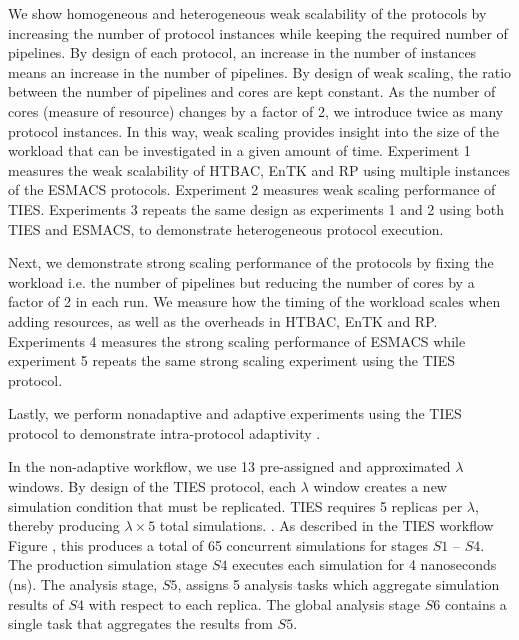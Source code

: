     We show homogeneous and heterogeneous weak scalability of the protocols by
increasing the number of protocol instances while keeping the required number
of pipelines. By design of each protocol, an increase in the number of
instances means an increase in the number of pipelines.  By design of weak 
scaling, the ratio between the number of pipelines and cores are kept constant. 
As the number of cores (measure of resource) changes by a factor of 2, we 
introduce twice as many protocol instances. In this way, weak scaling provides 
insight into the size of the workload that can be investigated in a given amount 
of time.
    Experiment 1 measures the weak scalability of HTBAC, EnTK and RP using 
multiple instances of the ESMACS protocols. Experiment 2 measures weak scaling 
performance of TIES. Experiments 3 repeats the same design as experiments 1 and 
2 using both TIES and ESMACS, to demonstrate heterogeneous protocol execution. 

    Next, we demonstrate strong scaling performance of the protocols by fixing 
the workload i.e. the number of pipelines but reducing the number of cores 
by a factor of 2 in each run. We measure how the timing of the workload 
scales when adding resources,  as well as the overheads in HTBAC, EnTK and RP. Experiments 4 
measures the strong scaling performance of ESMACS while experiment 5 repeats the 
same strong scaling experiment using the TIES protocol. 

    Lastly, we perform nonadaptive and adaptive experiments using the TIES 
protocol to demonstrate intra-protocol adaptivity . 

In the non-adaptive workflow, we use 13 pre-assigned and approximated $\lambda$ 
windows.  By design of the TIES protocol, each $\lambda$ 
window creates a new simulation condition that must be replicated. TIES requires 
5 replicas per $\lambda$, thereby producing 
$\lambda \times 5$ 
total simulations. . As described in the TIES workflow 
Figure , this produces a total of 65 
concurrent simulations for stages $S1$ -- $S4$. The production simulation stage 
$S4$ executes each simulation for 4 nanoseconds (ns). The analysis stage, $S5$, 
assigns 5 analysis tasks which aggregate simulation results of $S4$ with 
respect to each replica. The global analysis stage $S6$ contains a single task
that aggregates the results from $S5$.  

